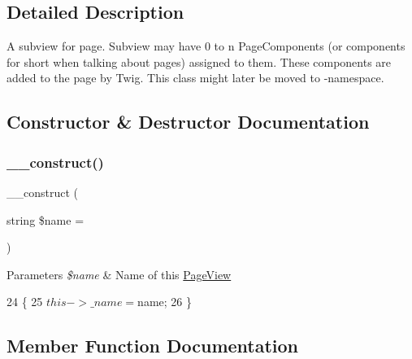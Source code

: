 \subsection{Detailed Description}
A subview for page. Subview may have 0 to n Page\+Components (or components for short when talking about pages) assigned to them. These components are added to the page by Twig. This class might later be moved to  -\/namespace. 

\subsection{Constructor \& Destructor Documentation}
\mbox{\label{class_lora_1_1_page_view_af90bbf86e6056724a44e281fb7125565}} 
\subsubsection{\texorpdfstring{\+\_\+\+\_\+construct()}{\_\_construct()}}
{\footnotesize\ttfamily \+\_\+\+\_\+construct (\begin{DoxyParamCaption}\item[{string}]{\$name = {\ttfamily \textquotesingle{}\textquotesingle{}} }\end{DoxyParamCaption})}


\begin{DoxyParams}{Parameters}
{\em \$name} & Name of this \hyperlink{class_lora_1_1_page_view}{Page\+View} \\
\hline
\end{DoxyParams}

\begin{DoxyCode}
24                                                     \{
25         $this->\_name = $name;
26     \}
\end{DoxyCode}


\subsection{Member Function Documentation}
\mbox{\label{class_lora_1_1_page_view_aa3b783aa411b948184d94c54f1b5e2b3}} 
